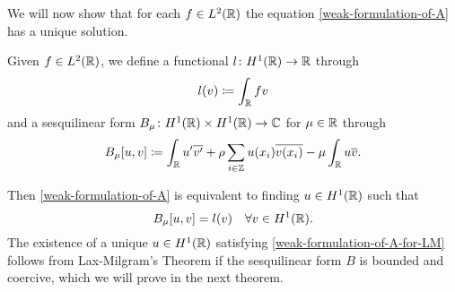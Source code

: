 We will now show that for each $f \in L^{2}(\mathbb{R})$ the equation \eqref{weak-formulation-of-A} has a unique solution. 

\begin{definition}
	Given $f \in L^{2}(\mathbb{R})$, we define a functional $l \colon H^{1}(\mathbb{R}) \rightarrow \mathbb{R}$ through
	\[ l(v) \coloneqq \int_{\mathbb{R}} f v \]
and a sesquilinear form $B_{\mu} \colon H^{1}(\mathbb{R}) \times H^{1}(\mathbb{R}) \rightarrow \mathbb{C}$ for $\mu \in \mathbb{R}$ through
	\[ B_{\mu}[u, v] \coloneqq \int_{\mathbb{R}} u' \overline{v'} + \rho \sum_{i \in \mathbb{Z}} u(x_{i}) \overline{v(x_{i})} - \mu \int_{\mathbb{R}} u \overline{v}. \]
\end{definition}

Then \eqref{weak-formulation-of-A} is equivalent to finding $u \in H^{1}(\mathbb{R})$ such that
	\begin{equation}
		B_{\mu}[u, v] =  l(v) \quad \forall v \in H^{1}(\mathbb{R}). \label{weak-formulation-of-A-for-LM}
	\end{equation}
The existence of a unique $u \in H^{1}(\mathbb{R})$ satisfying \eqref{weak-formulation-of-A-for-LM} follows from Lax-Milgram's Theorem if the sesquilinear form $B$ is bounded and coercive, which we will prove in the next theorem.
